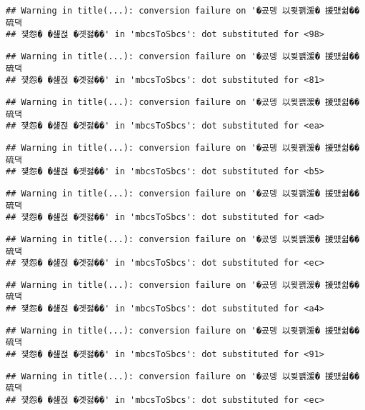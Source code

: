 \documentclass[
]{article}
\begin{document}
\begin{verbatim}
## Warning in title(...): conversion failure on '�곴뎅 以묒꽭湲� 援먰쉶�� 硫댁
## 쟻怨� �섎젅 �곗젏��' in 'mbcsToSbcs': dot substituted for <98>
\end{verbatim}

\begin{verbatim}
## Warning in title(...): conversion failure on '�곴뎅 以묒꽭湲� 援먰쉶�� 硫댁
## 쟻怨� �섎젅 �곗젏��' in 'mbcsToSbcs': dot substituted for <81>
\end{verbatim}

\begin{verbatim}
## Warning in title(...): conversion failure on '�곴뎅 以묒꽭湲� 援먰쉶�� 硫댁
## 쟻怨� �섎젅 �곗젏��' in 'mbcsToSbcs': dot substituted for <ea>
\end{verbatim}

\begin{verbatim}
## Warning in title(...): conversion failure on '�곴뎅 以묒꽭湲� 援먰쉶�� 硫댁
## 쟻怨� �섎젅 �곗젏��' in 'mbcsToSbcs': dot substituted for <b5>
\end{verbatim}

\begin{verbatim}
## Warning in title(...): conversion failure on '�곴뎅 以묒꽭湲� 援먰쉶�� 硫댁
## 쟻怨� �섎젅 �곗젏��' in 'mbcsToSbcs': dot substituted for <ad>
\end{verbatim}

\begin{verbatim}
## Warning in title(...): conversion failure on '�곴뎅 以묒꽭湲� 援먰쉶�� 硫댁
## 쟻怨� �섎젅 �곗젏��' in 'mbcsToSbcs': dot substituted for <ec>
\end{verbatim}

\begin{verbatim}
## Warning in title(...): conversion failure on '�곴뎅 以묒꽭湲� 援먰쉶�� 硫댁
## 쟻怨� �섎젅 �곗젏��' in 'mbcsToSbcs': dot substituted for <a4>
\end{verbatim}

\begin{verbatim}
## Warning in title(...): conversion failure on '�곴뎅 以묒꽭湲� 援먰쉶�� 硫댁
## 쟻怨� �섎젅 �곗젏��' in 'mbcsToSbcs': dot substituted for <91>
\end{verbatim}

\begin{verbatim}
## Warning in title(...): conversion failure on '�곴뎅 以묒꽭湲� 援먰쉶�� 硫댁
## 쟻怨� �섎젅 �곗젏��' in 'mbcsToSbcs': dot substituted for <ec>
\end{verbatim}
\end{document}
